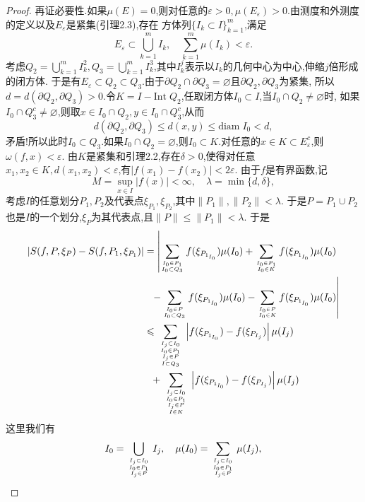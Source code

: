 \documentclass[a4paper,12pt]{article}
\begin{document}
{\begin{proof}
                再证必要性.如果$\mu(E)=0$,则对任意的$\varepsilon>0,\mu(E_\varepsilon)>0$.由测度和外测度的定义以及$E_\varepsilon$是紧集(引理2.3),存在
                方体列$\{I_k\subset I\}_{k=1}^m$,满足$$E_\varepsilon\subset\bigcup_{k=1}^mI_k,\quad \sum_{k=1}^m\mu(I_k)<\varepsilon.$$
                考虑$Q_2=\bigcup_{k=1}^mI_k^2,Q_3=\bigcup_{k=1}^mI_k^3$,其中$I_k^j$表示以$I_k$的几何中心为中心,伸缩$j$倍形成的闭方体.
                于是有$E_\varepsilon\subset Q_2\subset Q_3$.由于$\partial Q_2\cap\partial Q_3=\varnothing$且$\partial Q_2,\partial Q_3$为紧集,
                所以$d=d(\partial Q_2,\partial Q_3)>0$.令$K=I-\mathrm{Int}\; Q_2$,任取闭方体$I_0\subset I$,当$I_0\cap Q_2\not=\varnothing$时,
                如果$I_0\cap Q_3^c\not=\varnothing$,则取$x\in I_0\cap Q_2,y\in I_0\cap Q_3^c$,从而
                $$d(\partial Q_2,\partial Q_3)\leqslant d(x,y)\leqslant \mathrm{diam}\; I_0<d,$$
                矛盾!所以此时$I_0\subset Q_3$.如果$I_0\cap Q_2=\varnothing$,则$I_0\subset K$.对任意的$x\in K\subset E_\varepsilon^c$,则$\omega(f,x)<\varepsilon$.
                由$K$是紧集和引理2.2,存在$\delta>0$,使得对任意$x_1,x_2\in K,d(x_1,x_2)<\varepsilon$,有$|f(x_1)-f(x_2)|<2\varepsilon$.
                由于$f$是有界函数,记$$M=\sup_{x\in I}|f(x)|<\infty,\quad \lambda=\min\{d,\delta\},$$
                考虑$I$的任意划分$P_1,P_2$及代表点$\xi_{P_1},\xi_{P_2}$,其中$\|P_1\|,\|P_2\|<\lambda$.
                于是$P=P_1\cup P_2$也是$I$的一个划分,$\xi_P$为其代表点,且$\|P\|\leqslant\|P_1\|<\lambda$.
                于是
                \begin{align*}
                    |S(f,P,\xi_P)-S(f,P_1,\xi_{P_1})|&=\left|\sum_{I_0\in P_1\atop I_0\subset Q_3}f(\xi_{P_{1_{I_0}}})\mu(I_0)+\sum_{I_0\in P_1\atop I_0\in K}f(\xi_{P_{1_{I_0}}})\mu(I_0)\right.\\
                    &~~ \left.-\sum_{I_0\in P\atop I_0\subset Q_3}f(\xi_{P_{1_{I_0}}})\mu(I_0)-\sum_{I_0\in P\atop I_0\in K}f(\xi_{P_{1_{I_0}}})\mu(I_0)\right|\\
                    &\leqslant\sum_{{{I_j\subset I_0\atop I_0\in P_1}\atop I_j\in P}\atop I\subset Q_3}\left|f(\xi_{P_{1_{I_0}}})-f(\xi_{P_{I_j}})\right|\mu(I_j)\\
                    &~~ +\sum_{{{I_j\subset I_0\atop I_0\in P_1}\atop I_j\in P}\atop I\in K}\left|f(\xi_{P_{1_{I_0}}})-f(\xi_{P_{I_j}})\right|\mu(I_j)\\
                \end{align*}
                这里我们有$$I_0=\bigcup_{{{I_j\subset I_0}\atop I_0\in P_1}\atop I_j\in P}I_j,\quad \mu(I_0)=\sum_{{{I_j\subset I_0}\atop I_0\in P_1}\atop I_j\in P}\mu(I_j),$$

\end{proof}}
\end{document}
